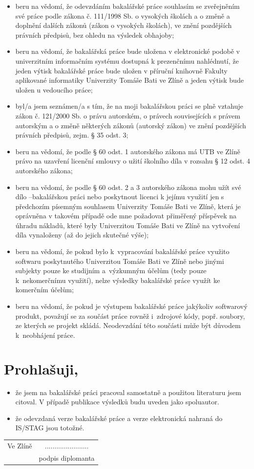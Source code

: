 \documentclass[a4paper,12pt,twoside,BCOR=10mm]{article}
\newcommand{\nmm}[1]{\section*{#1}} %
\begin{document}
\begin{itemize}\fontsize{10}{1}
\normalsize
\item beru na vědomí, že odevzdáním bakalářské práce souhlasím se zveřejněním své práce podle zákona č. 111/1998 Sb. o vysokých školách a o změně a doplnění dalších zákonů (zákon o vysokých školách), ve znění pozdějších právních předpisů, bez ohledu na výsledek obhajoby;
\item beru na vědomí, že bakalářská práce bude uložena v elektronické podobě v univerzitním informačním systému dostupná k prezenčnímu nahlédnutí, že jeden výtisk bakalářské práce bude uložen v příruční knihovně Fakulty aplikované informatiky Univerzity Tomáše Bati ve Zlíně a jeden výtisk bude uložen u vedoucího práce; 
\item byl/a jsem seznámen/a s tím, že na moji bakalářskou práci se plně vztahuje zákon č. 121/2000 Sb. o právu autorském, o právech souvisejících s právem autorským a o změně některých zákonů (autorský zákon) ve znění pozdějších právních předpisů, zejm. § 35 odst. 3;
\item beru na vědomí, že podle § 60 odst. 1 autorského zákona má UTB ve Zlíně právo na uzavření licenční smlouvy o užití školního díla v rozsahu § 12 odst. 4 autorského zákona;
\item beru na vědomí, že podle § 60 odst. 2 a 3 autorského zákona mohu užít své dílo –bakalářskou práci nebo poskytnout licenci k jejímu využití jen s předchozím písemným souhlasem Univerzity Tomáše Bati ve Zlíně, která je oprávněna v takovém případě ode mne požadovat přiměřený příspěvek na úhradu nákladů, které byly Univerzitou Tomáše Bati ve Zlíně na vytvoření díla vynaloženy (až do jejich skutečné výše);
\item beru na vědomí, že pokud bylo k~vypracování bakalářské práce využito softwaru poskytnutého Univerzitou Tomáše Bati ve Zlíně nebo jinými subjekty pouze ke studijním a~výzkumným účelům (tedy pouze k~nekomerčnímu využití), nelze výsledky bakalářské práce využít ke komerčním účelům;
\item beru na vědomí, že pokud je výstupem bakalářské práce jakýkoliv softwarový produkt, považují se za součást práce rovněž i~zdrojové kódy, popř. soubory, ze kterých se projekt skládá. Neodevzdání této součásti může být důvodem k~neobhájení práce.
\end{itemize}
\nmm{Prohlašuji,}
\begin{itemize}
 \normalsize
\item že jsem na bakalářské práci pracoval samostatně a použitou literaturu jsem citoval. V případě publikace výsledků budu uveden jako spoluautor.
\item že odevzdaná verze bakalářské práce a verze elektronická nahraná do IS/STAG jsou totožné.
\end{itemize}
\vspace{1cm}
\begin{tabular}{lc}
Ve Zlíně &\hspace{9cm} .......................\\
~ &\hspace{9cm} podpis diplomanta
\end{tabular}
\end{document}
